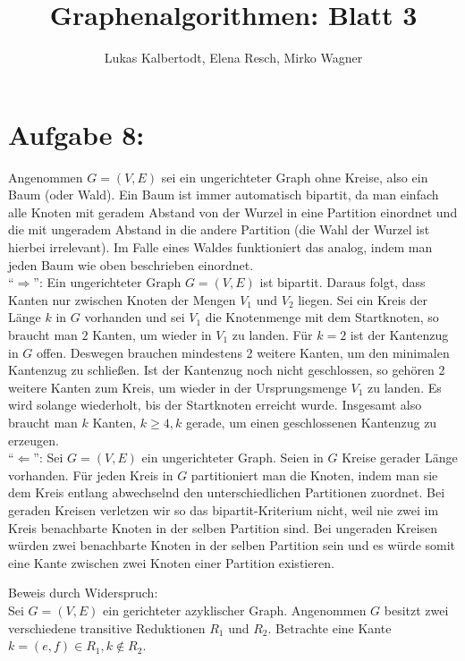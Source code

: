 \documentclass[11pt]{scrartcl} %
\title{Graphenalgorithmen: Blatt 3}
\author{Lukas Kalbertodt, Elena Resch, Mirko Wagner}
\begin{document}
\maketitle
\section*{Aufgabe 8:}
\begin{compactenum}[(a)]
\item Angenommen $G = (V, E)$ sei ein ungerichteter Graph ohne Kreise, also ein Baum (oder Wald). Ein Baum ist immer automatisch bipartit, da man einfach alle Knoten mit geradem Abstand von der Wurzel in eine Partition einordnet und die mit ungeradem Abstand in die andere Partition (die Wahl der Wurzel ist hierbei irrelevant). Im Falle eines Waldes funktioniert das analog, indem man jeden Baum wie oben beschrieben einordnet.\\
\enquote{$\Rightarrow$}: Ein ungerichteter Graph $G =(V,E)$ ist bipartit. Daraus folgt, dass Kanten nur zwischen Knoten der Mengen $V_1$ und $V_2$ liegen. Sei ein Kreis der Länge $k$ in $G$ vorhanden und sei $V_1$ die Knotenmenge mit dem Startknoten, so braucht man $2$ Kanten, um wieder in $V_1$ zu landen. Für $k=2$ ist der Kantenzug in $G$ offen. Deswegen brauchen mindestens 2 weitere Kanten, um den minimalen Kantenzug zu schließen. Ist der Kantenzug noch nicht geschlossen, so gehören 2 weitere Kanten zum Kreis, um wieder in der Ursprungsmenge $V_1$ zu landen. Es wird solange wiederholt, bis der Startknoten erreicht wurde.
Insgesamt also braucht man $k$ Kanten, $k \geq 4, k$ gerade, um einen geschlossenen Kantenzug zu erzeugen.\\
\enquote{$\Leftarrow$}: Sei $G=(V,E)$ ein ungerichteter Graph. Seien in $G$ Kreise gerader Länge vorhanden. Für jeden Kreis in $G$ partitioniert man die Knoten, indem man sie dem Kreis entlang abwechselnd den unterschiedlichen Partitionen zuordnet. Bei geraden Kreisen verletzen wir so das bipartit-Kriterium nicht, weil nie zwei im Kreis benachbarte Knoten in der selben Partition sind. Bei ungeraden Kreisen würden zwei benachbarte Knoten in der selben Partition sein und es würde somit eine Kante zwischen zwei Knoten einer Partition existieren.\\
\item Beweis durch Widerspruch:\\
Sei $G=(V,E)$ ein gerichteter azyklischer Graph. Angenommen $G$ besitzt zwei verschiedene transitive Reduktionen $R_1$ und $R_2$. Betrachte eine Kante $k=(e,f) \in R_1, k \notin R_2$. \\

\end{compactenum}
\end{document}
